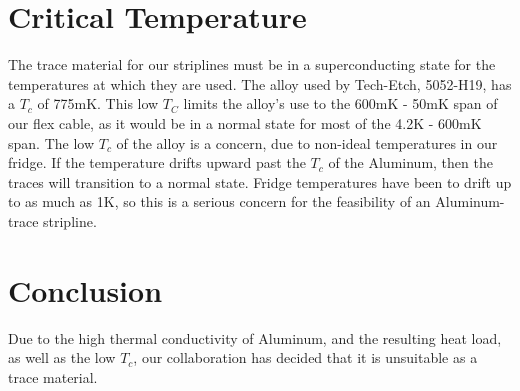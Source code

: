 \documentclass{report}
\begin{document}
\begin{appendices}
\section{Critical Temperature}

The trace material for our striplines must be in a superconducting state for the temperatures at which they are used. The alloy used by Tech-Etch, 5052-H19, has a $T_{c}$ of 775mK. This low $T_{C}$ limits the alloy's use to the 600mK - 50mK span of our flex cable, as it would be in a normal state for most of the 4.2K - 600mK span. The low $T_{c}$ of the alloy is a concern, due to non-ideal temperatures in our fridge. If the temperature drifts upward past the $T_{c}$ of the Aluminum, then the traces will transition to a normal state. Fridge temperatures have been to drift up to as much as 1K, so this is a serious concern for the feasibility of an Aluminum-trace stripline.

\section{Conclusion}

Due to the high thermal conductivity of Aluminum, and the resulting heat load, as well as the low $T_{c}$, our collaboration has decided that it is unsuitable as a trace material.

\end{appendices}

\newpage

\end{document}
